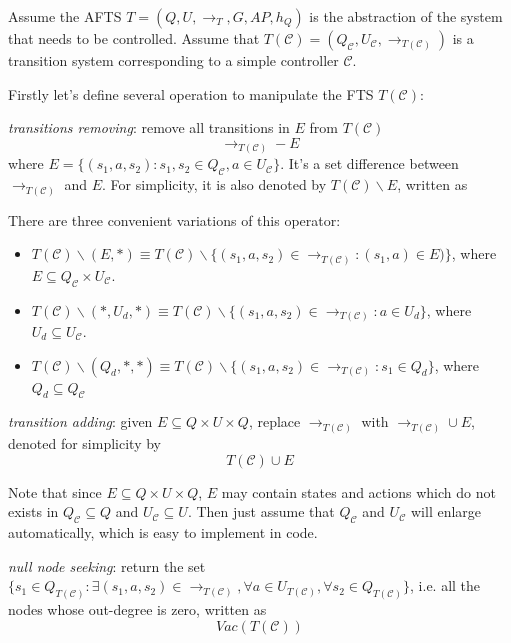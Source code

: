 Assume the AFTS $ T = (Q,U,\rightarrow_T, G, AP, h_Q) $ is the abstraction of the system that needs to be controlled. Assume that $ T(\mathcal{C})=(Q_{\mathcal{C}}, U_{\mathcal{C}},\rightarrow_{T(\mathcal{C})})$ is a transition system corresponding to a simple controller $ \mathcal{C} $. 

Firstly let's define several operation to manipulate the FTS $ T(\mathcal{C}) $:

\emph{transitions removing}: remove all transitions in $ E $ from $ T(\mathcal{C}) $
\begin{displaymath}
\rightarrow_{T(\mathcal{C})} - E
\end{displaymath}
where $ E = \{(s_1,a,s_2): s_1,s_2\in Q_{\mathcal{C}}, a\in U_{\mathcal{C}}\} $. It's a set difference between $ \rightarrow_{T(\mathcal{C})} $ and $ E $. For simplicity, it is also denoted by $ T(\mathcal{C})\backslash E $, written as

There are three convenient variations of this operator:
\begin{itemize}
	\item $ T(\mathcal{C}) \backslash (E,*) \equiv T(\mathcal{C})\backslash \{(s_1,a,s_2)\in \rightarrow_{T(\mathcal{C})}: (s_1,a)\in E)\}$, where $ E \subseteq Q_{\mathcal{C}}\times U_{\mathcal{C}} $.
	\item $ T(\mathcal{C}) \backslash (*,U_d,*) \equiv T(\mathcal{C})\backslash \{(s_1,a,s_2)\in \rightarrow_{T(\mathcal{C})}: a\in U_d \}$, where $ U_d\subseteq U_{\mathcal{C}} $.
	\item $ T(\mathcal{C}) \backslash (Q_d,*,*)\equiv T(\mathcal{C})\backslash \{ (s_1,a,s_2)\in \rightarrow_{T(\mathcal{C})}: s_1\in Q_d \}$, where $ Q_d \subseteq Q_{\mathcal{C}} $ 
\end{itemize}

\emph{transition adding}: given $ E \subseteq Q \times U \times Q$, replace $ \rightarrow_{T(\mathcal{C})} $ with $ \rightarrow_{T(\mathcal{C})}\cup E $, denoted for simplicity by
\begin{displaymath}
T(\mathcal{C})\cup E
\end{displaymath}

Note that since $ E \subseteq Q\times U\times Q $, $ E $ may contain states and actions which do not exists in $ Q_{\mathcal{C}}\subseteq Q $ and $ U_{\mathcal{C}}\subseteq U $. Then just assume that $ Q_{\mathcal{C}} $ and $ U_{\mathcal{C}} $ will enlarge automatically, which is easy to implement in code.

\emph{null node seeking}: return the set $\{s_1\in Q_{T(\mathcal{C})}: \exists (s_1,a,s_2)\in \rightarrow_{T(\mathcal{C})},\forall a\in U_{T(\mathcal{C})}, \forall s_2 \in Q_{T(\mathcal{C})}\} $, i.e. all the nodes whose out-degree is zero, written as
\begin{displaymath}
Vac(T(\mathcal{C}))
\end{displaymath}

